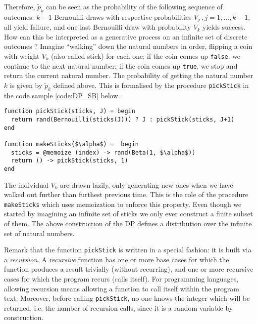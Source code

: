 Therefore, $\tilde{p}_k$ can be seen as the probability of the following sequence of outcomes: $k-1$ Bernouilli draws with respective probabilities $V_j \ , j=1,\dots,k-1$, all yield failure, and one last Bernouilli draw with probability $V_k$ yields success.
How can this be interpreted as a generative process on an infinite set of discrete outcomes ?
Imagine ``walking'' down the natural numbers in order, flipping a coin with weight $V_k$ (also called stick) for each one; if the coin comes up \texttt{false}, we continue to the next natural number; if the coin comes up \texttt{true}, we stop and return the current natural number. The probability of getting the natural number $k$ is given by $\tilde{p}_k$ defined above. This is formalised by the procedure \texttt{pickStick} in the code sample \ref{code:DP_SB} below.

\begin{lstlisting}[caption={\acrlong{DP} stick-breaking representation written in Julia.},captionpos=b,label=code:DP_SB]
function pickStick(sticks, J) = begin
  return rand(Bernouilli(sticks(J))) ? J : pickStick(sticks, J+1)
end

function makeSticks($\alpha$) =  begin
  sticks = @memoize (index) -> rand(Beta(1, $\alpha$))
  return () -> pickStick(sticks, 1)
end
\end{lstlisting}

The individual $V_k$ are drawn lazily, only generating new ones when we have walked out further than furthest previous time. This is the role of the procedure \texttt{makeSticks} which uses memoization to enforce this property. Even though we started by imagining an infinite set of sticks we only ever construct a finite subset of them. The above construction of the \gls{DP} defines a distribution over the infinite set of natural numbers.

Remark that the function \texttt{pickStick} is written in a special fashion: it is built via a \textit{recursion}. A \textit{recursive} function has one or more base cases for which the function produces a result trivially (without recurring), and one or more recursive cases for which the program recurs (calls itself). For programming languages, allowing recursion means allowing a function to call itself within the program text. Moreover, before calling \texttt{pickStick}, no one knows the integer which will be returned, i.e. the number of recursion calls, since it is a random variable by construction.

